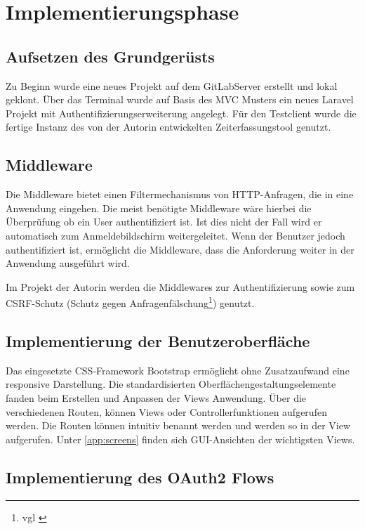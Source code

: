 \section{Implementierungsphase} 
\label{sec:Implementierungsphase}

\subsection{Aufsetzen des Grundgerüsts}
\label{sec:AufsetzenGrundgeruest}

Zu Beginn wurde eine neues Projekt auf dem GitLabServer erstellt und lokal geklont. Über das Terminal wurde auf Basis des MVC Musters ein neues Laravel Projekt mit Authentifizierungserweiterung angelegt. 
Für den Testclient wurde die fertige Instanz des von der Autorin entwickelten Zeiterfassungstool genutzt.

\subsection{Middleware}
\label{sec:Middleware}
Die Middleware bietet einen Filtermechanismus von HTTP-Anfragen, die in eine Anwendung eingehen. Die meist benötigte Middleware wäre hierbei die Überprüfung ob ein User authentifiziert ist. Ist dies nicht der Fall wird er automatisch zum Anmeldebildschirm weitergeleitet. Wenn der Benutzer jedoch authentifiziert ist, ermöglicht die Middleware, dass die Anforderung weiter in der Anwendung ausgeführt wird.

Im Projekt der Autorin werden die Middlewares zur Authentifizierung sowie zum \acs{CSRF}-Schutz (Schutz gegen Anfragenfälschung\footnote{vgl \cite{CSRF}}) genutzt.

\subsection{Implementierung der Benutzeroberfläche}
\label{sec:ImplBenutzeroberflaeche}

Das eingesetzte CSS-Framework Bootstrap ermöglicht ohne Zusatzaufwand eine responsive Darstellung. Die standardisierten Oberflächengestaltungselemente fanden beim Erstellen und Anpassen der Views Anwendung. 
Über die verschiedenen Routen, können Views oder Controllerfunktionen aufgerufen werden. Die Routen können intuitiv benannt werden und werden so in der View aufgerufen.
Unter \ref{app:screens} finden sich GUI-Ansichten der wichtigsten Views.

\subsection{Implementierung des OAuth2 Flows}
\label{sec:ImplementierungOAuth2}

